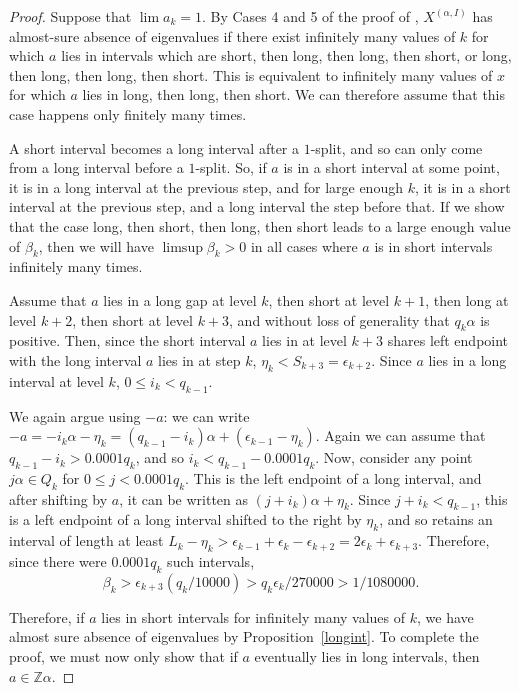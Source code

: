 \documentclass[11pt,reqno]{amsart}
\theoremstyle{definition}
\theoremstyle{plain}
\begin{document}
\begin{proof}
Suppose that $\lim a_k = 1$. By Cases 4 and 5 of the proof of , $X^{(\alpha, I)}$ has almost-sure absence of eigenvalues if there exist infinitely many values of $k$ for which $a$ lies in intervals which are short, then long, then long, then short, or long, then long, then long, then short. This is equivalent to infinitely many values of $x$ for which $a$ lies in long, then long, then short. We can therefore assume that this case happens only finitely many times.

A short interval becomes a long interval after a $1$-split, and so can only come from a long interval before a $1$-split.
So, if $a$ is in a short interval at some point, it is in a long interval at the previous step, and for large enough $k$, it is in a short interval at the previous step, and a long interval the step before that. If we show that the case 
long, then short, then long, then short leads to a large enough value of $\beta_k$, then we will have $\limsup \beta_k > 0$ in all cases where $a$ is in short intervals infinitely many times.

Assume that $a$ lies in a long gap at level $k$, then short at level $k+1$, then long at level $k+2$, then short at level $k+3$, and without loss of generality that $q_k \alpha$ is positive. Then, since the short interval $a$ lies in at level $k+3$ shares left endpoint with the long interval $a$ lies in at step $k$, $\eta_k < S_{k+3} = \epsilon_{k+2}$. Since $a$ lies in a long interval at level $k$, $0 \leq i_k < q_{k-1}$. 

We again argue using $-a$: we can write $-a = -i_k \alpha - \eta_k = (q_{k-1} - i_k) \alpha + (\epsilon_{k-1} - \eta_k)$. Again we can assume that $q_{k-1} - i_k > 0.0001 q_k$, and so $i_k < q_{k-1} - 0.0001q_k$. Now, consider any point $j\alpha \in Q_k$ for
$0 \leq j < 0.0001q_k$. This is the left endpoint of a long interval, and after shifting by $a$, it can be written 
as $(j + i_k)\alpha + \eta_k$. Since $j + i_k < q_{k-1}$, this is a left endpoint of a long interval shifted to the right by $\eta_k$, and so retains an interval of length at least $L_k - \eta_k > \epsilon_{k-1} + \epsilon_k - \epsilon_{k+2}
 = 2\epsilon_k + \epsilon_{k+3}$. Therefore, since there were $0.0001q_k$ such intervals,\
\[
\beta_k > \epsilon_{k+3}(q_k/10000) > q_k \epsilon_k/270000 > 1/1080000.
\]

Therefore, if $a$ lies in short intervals for infinitely many values of $k$, we have almost sure absence of eigenvalues by 
Proposition~\ref{longint}. To complete the proof, we must now only show that if $a$ eventually lies in long intervals, then $a \in \mathbb{Z}\alpha$. 


\end{proof}
\end{document}
